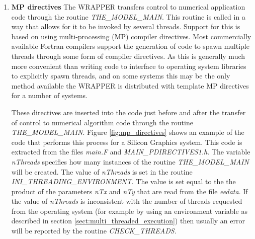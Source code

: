 \begin{enumerate}
\item {\bf MP directives}
The WRAPPER transfers control to numerical application code through
the routine {\em THE\_MODEL\_MAIN}. This routine is called in a way
that allows for it to be invoked by several threads. Support for this
is based on using multi-processing (MP) compiler directives.
Most commercially available Fortran compilers support the generation
of code to spawn multiple threads through some form of compiler directives.
As this is generally much more convenient than writing code to interface
to operating system libraries to explicitly spawn threads, and on some systems
this may be the only method available the WRAPPER is distributed with
template MP directives for a number of systems.

 These directives are inserted into the code just before and after the 
transfer of control to numerical algorithm code through the routine
{\em THE\_MODEL\_MAIN}. Figure \ref{fig:mp_directives} shows an example of 
the code that performs this process for a Silicon Graphics system.
This code is extracted from the files {\em main.F} and
{\em MAIN\_PDIRECTIVES1.h}. The variable {\em nThreads} specifies
how many instances of the routine {\em THE\_MODEL\_MAIN} will
be created. The value of {\em nThreads} is set in the routine
{\em INI\_THREADING\_ENVIRONMENT}. The value is set equal to the
the product of the parameters {\em nTx} and {\em nTy} that
are read from the file {\em eedata}. If the value of {\em nThreads}
is inconsistent with the number of threads requested from the
operating system (for example by using an environment
variable as described in section \ref{sect:multi_threaded_execution})
then usually an error will be reported by the routine 
{\em CHECK\_THREADS}.\\



\end{enumerate}
